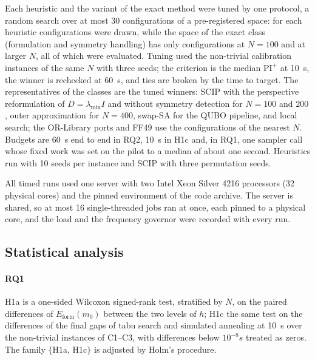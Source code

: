 Each heuristic and the variant of the exact method were tuned by one protocol, a random search over at most 30
configurations of a pre-registered space: for each heuristic  configurations were drawn, while
the space of the exact class (formulation and symmetry handling) has only 
configurations at $N = 100$ and  at larger $N$, all of which were evaluated. Tuning
used the non-trivial calibration instances of the same $N$ with three seeds; the criterion is the
median $\mathrm{PI}^{+}$ at 10~s, the winner is rechecked at 60~s, and ties are broken by the time to target. The
representatives of the classes are the tuned winners: SCIP with the perspective reformulation of
$D = \lambda_{\min} I$ and without symmetry detection for $N = 100$ and $200$, outer approximation for $N = 400$, swap-SA
for the QUBO pipeline, and local search; the OR-Library ports and FF49 use the configurations of the nearest $N$.
Budgets are 60~s end to end in RQ2, 10~s in H1c and, in RQ1, one sampler call whose fixed work was set on the pilot to
a median of about one second. Heuristics run with 10 seeds per instance and SCIP with three permutation seeds.

All timed runs used one server with two Intel Xeon Silver 4216 processors (32 physical cores) and the pinned
environment of the code archive. The server is shared, so at most 16 single-threaded jobs ran at once, each pinned to
a physical core, and the load and the frequency governor were recorded with every run.

\subsection{Statistical analysis}\label{sec:stats}

\paragraph{RQ1} H1a is a one-sided Wilcoxon signed-rank test, stratified by $N$, on the paired differences of
$E_{\mathrm{form}}(m_0)$ between the two levels of $h$; H1c the same test on the differences of the final gaps of tabu
search and simulated annealing at 10~s over the non-trivial instances of C1--C3, with differences below
$10^{-8} s$ treated as zeros. The family $\{$H1a, H1c$\}$ is adjusted by Holm's procedure.

